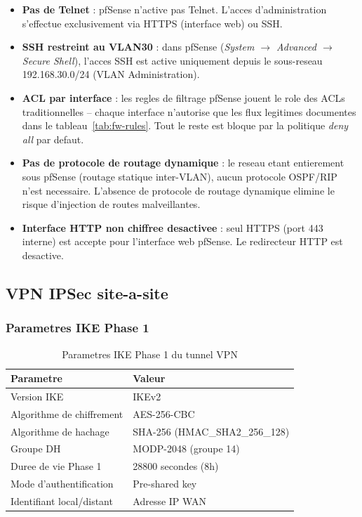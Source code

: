 \documentclass[11pt,a4paper]{article}
\begin{document}
\begin{itemize}[leftmargin=1.4em,noitemsep]
  \item \textbf{Pas de Telnet} : pfSense n'active pas Telnet. L'acces d'administration s'effectue exclusivement via HTTPS (interface web) ou SSH.
  \item \textbf{SSH restreint au VLAN30} : dans pfSense (\textit{System $\to$ Advanced $\to$ Secure Shell}), l'acces SSH est active uniquement depuis le sous-reseau 192.168.30.0/24 (VLAN Administration).
  \item \textbf{ACL par interface} : les regles de filtrage pfSense jouent le role des ACLs traditionnelles -- chaque interface n'autorise que les flux legitimes documentes dans le tableau~\ref{tab:fw-rules}. Tout le reste est bloque par la politique \emph{deny all} par defaut.
  \item \textbf{Pas de protocole de routage dynamique} : le reseau etant entierement sous pfSense (routage statique inter-VLAN), aucun protocole OSPF/RIP n'est necessaire. L'absence de protocole de routage dynamique elimine le risque d'injection de routes malveillantes.
  \item \textbf{Interface HTTP non chiffree desactivee} : seul HTTPS (port 443 interne) est accepte pour l'interface web pfSense. Le redirecteur HTTP est desactive.
\end{itemize}

\subsection{VPN IPSec site-a-site}

\subsubsection{Parametres IKE Phase 1}

\begin{table}[H]
\centering
\begin{tabular}{@{}ll@{}}
\toprule
\textbf{Parametre} & \textbf{Valeur} \\
\midrule
Version IKE & IKEv2 \\
Algorithme de chiffrement & AES-256-CBC \\
Algorithme de hachage & SHA-256 (HMAC\_SHA2\_256\_128) \\
Groupe DH & MODP-2048 (groupe 14) \\
Duree de vie Phase 1 & 28800 secondes (8h) \\
Mode d'authentification & Pre-shared key \\
Identifiant local/distant & Adresse IP WAN \\
\bottomrule
\end{tabular}
\caption{Parametres IKE Phase 1 du tunnel VPN}
\label{tab:ike-p1}
\end{table}
\end{document}

